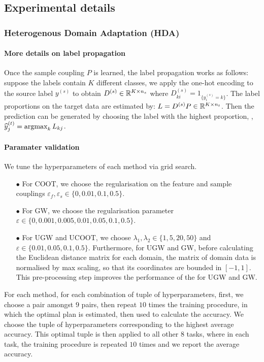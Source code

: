 \subsection{Experimental details} \label{sec_app:exp}

\subsubsection{Heterogenous Domain Adaptation (HDA)}

\paragraph{More details on label propagation}

Once the sample coupling $P$ is learned, the label propagation works as follows:
suppose the labels contain $K$ different classes,
we apply the one-hot encoding to the source label $y^{(s)}$ to obtain
$D^{(s)} \in \mathbb R^{K \times n_s}$ where $D^{(s)}_{ki} = 1_{\{y^{(s)}_i = k\}}$.
The label proportions on the target data are
estimated by: $L = D^{(s)} P \in \mathbb R^{K \times n_t}$. Then the prediction can be generated
by choosing the label with the highest proportion, \ie, $\widehat{y}^{(t)}_j = \operatorname*{argmax}_k L_{kj}$.

\paragraph{Paramater validation}

We tune the hyperparameters of each method via grid search.
\begin{itemize}
  \item[$\bullet$] For COOT, we choose the regularisation on the feature and sample couplings
  $\varepsilon_f, \varepsilon_s \in \{0, 0.01, 0.1, 0.5\}$.
  \item[$\bullet$] For GW, we choose the regularisation parameter
  $\varepsilon \in \{0, 0.001, 0.005, 0.01, 0.05, 0.1, 0.5\}$.
  \item[$\bullet$] For UGW and UCOOT, we choose $\lambda_1, \lambda_2 \in \{1, 5, 20, 50\}$ and
  $\varepsilon \in \{0.01, 0.05, 0.1, 0.5\}$.
  Furthermore, for UGW and GW, before calculating the Euclidean distance matrix for each domain,
  the matrix of domain data is normalised by max scaling, so that its coordinates are bounded in
  $[-1,1]$. This pre-processing step improves the performance of the for UGW and GW.
\end{itemize}
For each method, for each combination of tuple of hyperparameters, first, we choose a pair
amongst $9$ pairs, then repeat $10$ times the training procedure, in which the optimal plan
is estimated, then used to calculate the accuracy. We choose the tuple of hyperparameters
corresponding to the highest average accuracy. This optimal tuple is then applied to
all other $8$ tasks, where in each task, the training procedure is repeated $10$ times and
we report the average accuracy.

